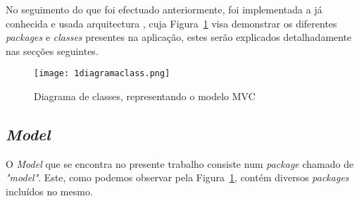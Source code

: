 \documentclass{article}
\begin{document}
No seguimento do que foi efectuado anteriormente, foi implementada a já conhecida e usada arquitectura , cuja Figura~\ref{fig:arq} visa demonstrar os diferentes \textit{packages} e \textit{classes} presentes na aplicação, estes serão explicados detalhadamente nas secções seguintes.

\begin{figure}[H]
\texttt{[image: 1diagramaclass.png]}
\centering
\caption{Diagrama de classes, representando o modelo MVC\label{fig:arq}}
\end{figure}

\newpage

\subsection{\textit{Model}}

O \textit{Model} que se encontra no presente trabalho consiste num \textit{package} chamado de \textit{"model"}. Este, como podemos observar pela Figura~\ref{fig:arq}, contém diversos \textit{packages} incluídos no mesmo.
\end{document}
